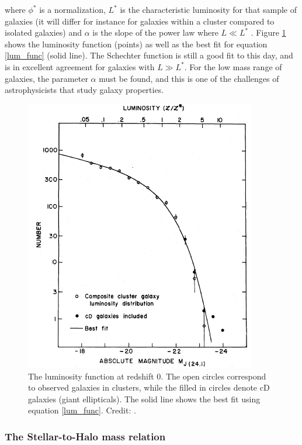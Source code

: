 where $\phi^*$ is a normalization, $L^*$ is the characteristic luminosity for that sample of galaxies (it will differ for instance for galaxies within a cluster compared to isolated galaxies) and $\alpha$ is the slope of the power law where $L\ll L^*$ \parencite{Schechter1976}. Figure \ref{luminosity_function} shows the luminosity function (points) as well as the best fit for equation \ref{lum_func} (solid line). The Schechter function is still a good fit to this day, and is in excellent agreement for galaxies with $L \gg L^*$. For the low mass range of galaxies, the parameter $\alpha$ must be found, and this is one of the challenges of astrophysicists that study galaxy properties.

\begin{figure}
    \centering
    \includegraphics[width=0.9\textwidth]{images/luminosity_function.png}
    \caption{The luminosity function at redshift 0. The open circles correspond to observed galaxies in clusters, while the filled in circles denote cD galaxies (giant ellipticals). The solid line shows the best fit using equation \ref{lum_func}. Credit: \textcite{Schechter1976}.}
    \label{luminosity_function}
\end{figure}

\subsubsection{The Stellar-to-Halo mass relation}

